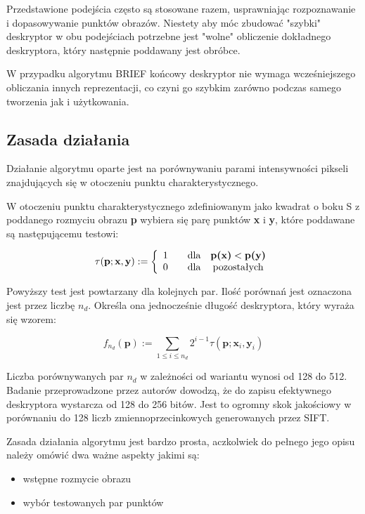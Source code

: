 Przedstawione podejścia często są stosowane razem, usprawniając rozpoznawanie i dopasowywanie punktów obrazów. Niestety aby móc zbudować "szybki" deskryptor w obu podejściach potrzebne jest "wolne" obliczenie dokładnego deskryptora, który następnie poddawany jest obróbce. 

W przypadku algorytmu BRIEF końcowy deskryptor nie wymaga wcześniejszego obliczania innych reprezentacji, co czyni go szybkim zarówno podczas samego tworzenia jak i użytkowania.



\subsection{Zasada działania}

Działanie algorytmu oparte jest na porównywaniu parami intensywności pikseli znajdujących się w otoczeniu punktu charakterystycznego. 

W otoczeniu punktu charakterystycznego zdefiniowanym jako kwadrat o boku S z poddanego rozmyciu obrazu \textbf{p} wybiera się parę punktów \textbf{x} i \textbf{y}, które poddawane są następującemu testowi:

\begin{equation}
\tau(\textbf{p};\textbf{x},\textbf{y}) := \left\lbrace \begin{array}{cccc}
1 & & $dla$ & \textbf{p(x)}< \textbf{p(y)}\\
0 & & $dla$ & $pozostałych$
\end{array}
\right.
\label{eqn:brief_test}
\end{equation}

Powyższy test jest powtarzany dla kolejnych par. Ilość porównań jest oznaczona jest przez liczbę $n_d$. Określa ona jednocześnie długość deskryptora, który wyraża się wzorem:



\begin{equation}
f_{n_d}(\textbf{p}):= \sum\limits_{1 \leq i \leq n_d} 2^{i-1} \tau(\textbf{p};\textbf{x}_i,\textbf{y}_i)
\end{equation}

Liczba porównywanych par $n_d$ w zależności od wariantu wynosi od 128 do 512. Badanie przeprowadzone przez autorów dowodzą, że do zapisu efektywnego deskryptora wystarcza od 128 do 256 bitów. Jest to ogromny skok jakościowy w porównaniu do 128 liczb zmiennoprzecinkowych generowanych przez SIFT.

Zasada działania algorytmu jest bardzo prosta, aczkolwiek do pełnego jego opisu należy omówić dwa ważne aspekty jakimi są:
\begin{itemize}
\item wstępne rozmycie obrazu
\item wybór testowanych par punktów
\end{itemize}


